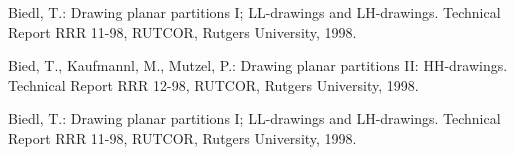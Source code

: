 \documentclass[12pt,a4report]{report}
\theoremstyle{definition}
\begin{document}
\begin{thebibliography}{9}
	Biedl, T.: Drawing planar partitions I; LL-drawings and LH-drawings. Technical Report RRR 11-98, RUTCOR, Rutgers University, 1998.

	 Bied, T., Kaufmannl, M., Mutzel, P.: Drawing planar partitions II: 
HH-drawings. Technical Report RRR 12-98, RUTCOR, Rutgers University, 1998.

	Biedl, T.: Drawing planar partitions I; LL-drawings and LH-drawings. Technical Report RRR 11-98, RUTCOR, Rutgers University, 1998.

\end{thebibliography}
\end{document}
